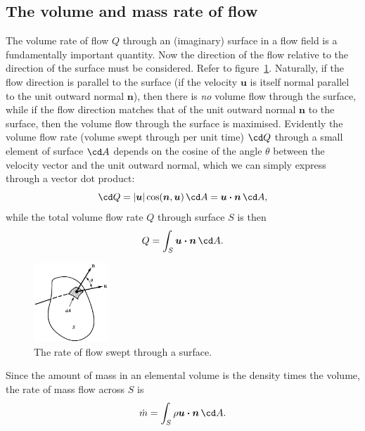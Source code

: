 \documentclass[a4paper,11pt]		{report}
\begin{document}
\subsection{The volume and mass rate of flow}

The volume rate of flow $Q$ through an (imaginary) surface in a flow
field is a fundamentally important quantity. Now the direction of the
flow relative to the direction of the surface must be
considered. Refer to figure~\ref{fig.flowQ}. Naturally, if the flow
direction is parallel to the surface (\ie if the velocity $\bm{u}$ is
itself normal parallel to the unit outward normal $\bm{n}$), then
there is \emph{no} volume flow through the surface, while if the flow
direction matches that of the unit outward normal $\bm{n}$ to the
surface, then the volume flow through the surface is
maximised. Evidently the volume flow rate (volume swept through per
unit time) $\cd Q$ through a small element of surface $\cd A$ depends
on the cosine of the angle $\theta$ between the velocity vector and
the unit outward normal, which we can simply express through a vector
dot product:
\[
\cd Q=|\bm{u}| \cos(\bm{n}, \bm{u})\,\cd A = \bm{u\cdot n}\,\cd A,
\]
while the total volume flow rate $Q$ through surface $S$ is then
\[
Q = \int_S \bm{u\cdot n}\,\cd A.
\]

\begin{figure}
\begin{center}
\includegraphics[width=0.25\textwidth]{White-1.3a.eps}
\end{center}
\caption{The rate of flow swept through a surface. \citep[From][]{white86}}
\label{fig.flowQ}
\end{figure}

Since the amount of mass in an elemental volume is the density times
the volume, the rate of mass flow across $S$ is
\[
\dot{m}=\int_S \rho\bm{u\cdot n}\,\cd A.
\]
\end{document}

